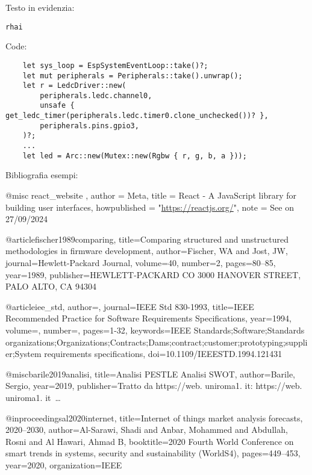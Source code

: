 Testo in evidenzia:

\texttt{rhai}

Code:

\begin{listing}[H]
    \begin{verbatim}
    let sys_loop = EspSystemEventLoop::take()?;
    let mut peripherals = Peripherals::take().unwrap();
    let r = LedcDriver::new(
        peripherals.ledc.channel0,
        unsafe { get_ledc_timer(peripherals.ledc.timer0.clone_unchecked())? },
        peripherals.pins.gpio3,
    )?;
    ...
    let led = Arc::new(Mutex::new(Rgbw { r, g, b, a }));
\end{verbatim}
\vspace{-1em}
\end{listing}

Bibliografia esempi:

@misc{ react_website ,
    author = {Meta},
    title = {React - A JavaScript library for building user interfaces},
    howpublished = "\url{https://reactjs.org/}",
    note = {See on 27/09/2024}
}

@article{fischer1989comparing,
  title={Comparing structured and unstructured methodologies in firmware development},
  author={Fischer, WA and Jost, JW},
  journal={Hewlett-Packard Journal},
  volume={40},
  number={2},
  pages={80--85},
  year={1989},
  publisher={HEWLETT-PACKARD CO 3000 HANOVER STREET, PALO ALTO, CA 94304}
}

@article{iee_std,
  author={},
  journal={IEEE Std 830-1993},
  title={IEEE Recommended Practice for Software Requirements Specifications},
  year={1994},
  volume={},
  number={},
  pages={1-32},
  keywords={IEEE Standards;Software;Standards organizations;Organizations;Contracts;Dams;contract;customer;prototyping;supplier;System requirements specifications},
  doi={10.1109/IEEESTD.1994.121431}
}

@misc{barile2019analisi,
  title={Analisi PESTLE Analisi SWOT},
  author={Barile, Sergio},
  year={2019},
  publisher={Tratto da https://web. uniroma1. it: https://web. uniroma1. it~…}
}

@inproceedings{al2020internet,
  title={Internet of things market analysis forecasts, 2020--2030},
  author={Al-Sarawi, Shadi and Anbar, Mohammed and Abdullah, Rosni and Al Hawari, Ahmad B},
  booktitle={2020 Fourth World Conference on smart trends in systems, security and sustainability (WorldS4)},
  pages={449--453},
  year={2020},
  organization={IEEE}
}

